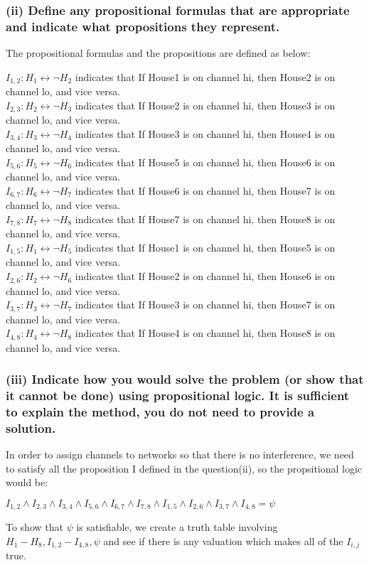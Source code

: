 \documentclass[]{article}
\begin{document}
\begin{spacing}{1.5}
		\subsubsection*{(ii) Define any propositional formulas that are appropriate and indicate what propositions they represent.}
		The propositional formulas and the propositions are defined as below: 
		\begin{center}
			$ I_{1,2}: H_1 \leftrightarrow \neg H_2 $ indicates that If House1 is on channel hi, then House2 is on channel lo, and vice versa.\\
			$ I_{2,3}: H_2 \leftrightarrow \neg H_3 $ indicates that If House2 is on channel hi, then House3 is on channel lo, and vice versa.\\
			$ I_{3,4}: H_3 \leftrightarrow \neg H_4 $ indicates that If House3 is on channel hi, then House4 is on channel lo, and vice versa.\\
			$ I_{5,6}: H_5 \leftrightarrow \neg H_6 $ indicates that If House5 is on channel hi, then House6 is on channel lo, and vice versa.\\
			$ I_{6,7}: H_6 \leftrightarrow \neg H_7 $ indicates that If House6 is on channel hi, then House7 is on channel lo, and vice versa.\\
			$ I_{7,8}: H_7 \leftrightarrow \neg H_8 $ indicates that If House7 is on channel hi, then House8 is on channel lo, and vice versa.\\ 
			$ I_{1, 5}: H_1 \leftrightarrow \neg H_5 $ indicates that If House1  is on channel hi, then House5 is on channel lo, and vice versa.\\ 
			$ I_{2,6}: H_2 \leftrightarrow \neg H_6 $ indicates that If House2 is on channel hi, then House6 is on channel lo, and vice versa.\\ 
			$ I_{3,7}: H_3 \leftrightarrow \neg H_7 $ indicates that If House3 is on channel hi, then House7 is on channel lo, and vice versa.\\ 
			$ I_{4,8}: H_4 \leftrightarrow \neg H_8 $ indicates that If House4 is on channel hi, then House8 is on channel lo, and vice versa.\\ 
		\end{center}
	
		
		\subsubsection*{(iii) Indicate how you would solve the problem (or show that it cannot be done) using propositional	logic. It is sufficient to explain the method, you do not need to provide a solution.}
		In order to assign channels to networks so that there is no interference, we need to satisfy all the proposition I defined in the question(ii), so the propsitional logic would be:
		\begin{center}
			$ I_{1,2}\wedge I_{2,3}\wedge I_{3,4}\wedge I_{5,6}\wedge I_{6,7}\wedge I_{7,8}\wedge I_{1, 5}\wedge I_{2,6}\wedge I_{3,7}\wedge I_{4,8} = \psi$
		\end{center}
		To show that $ \psi $ is satisfiable, we create a truth table involving $ H_1 - H_8,I_{1,2} -  I_{4,8}, \psi $ and see if there is any valuation which makes all of the $ I_{i,j} $ true.

\end{spacing}
\end{document}
